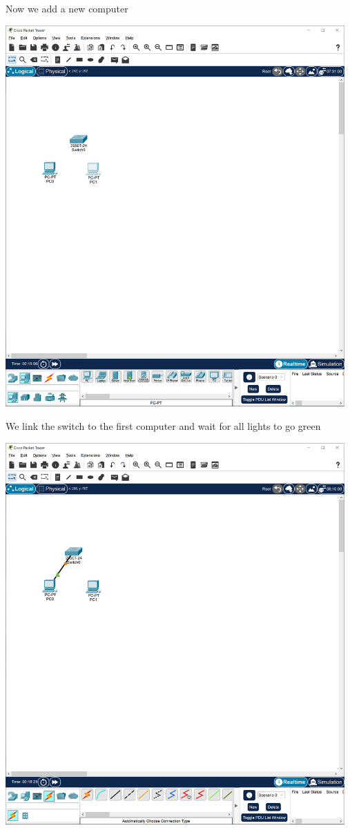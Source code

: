\documentclass[a4paper,12pt]{article}
\begin{document}
\noindent Now we add a new computer \newline

\noindent \includegraphics[width=13cm]{./step-by-step/7.PNG}
\clearpage


\noindent We link the switch to the first computer and wait for all lights to go green \newline

\noindent \includegraphics[width=13cm]{./step-by-step/8.PNG}
\clearpage
\end{document}
